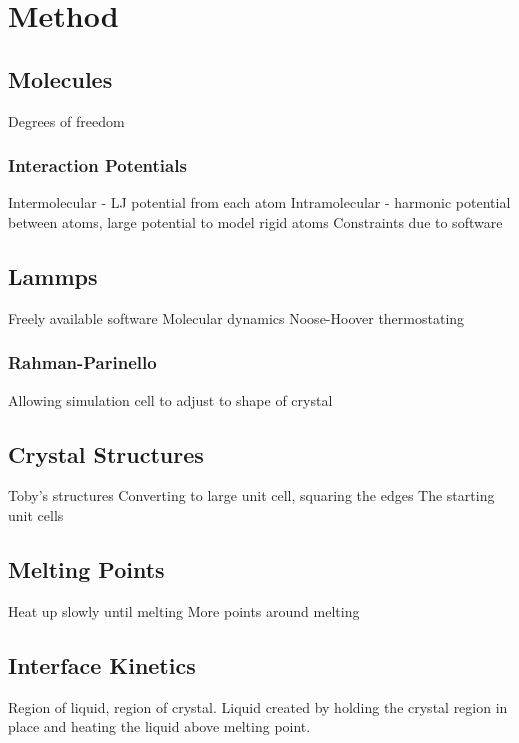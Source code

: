 
\chapter{Method}

\section{Molecules}
Degrees of freedom

\subsection{Interaction Potentials}
Intermolecular - LJ potential from each atom
Intramolecular - harmonic potential between atoms, large potential to model rigid atoms
Constraints due to software

\section{Lammps}
Freely available software
Molecular dynamics
Noose-Hoover thermostating


\subsection{Rahman-Parinello}
Allowing simulation cell to adjust to shape of crystal

\section{Crystal Structures}
Toby's structures
Converting to large unit cell, squaring the edges
The starting unit cells

\section{Melting Points}
Heat up slowly until melting
More points around melting

\section{Interface Kinetics}
Region of liquid, region of crystal. Liquid created by holding the crystal region in place and heating the liquid above melting point.


